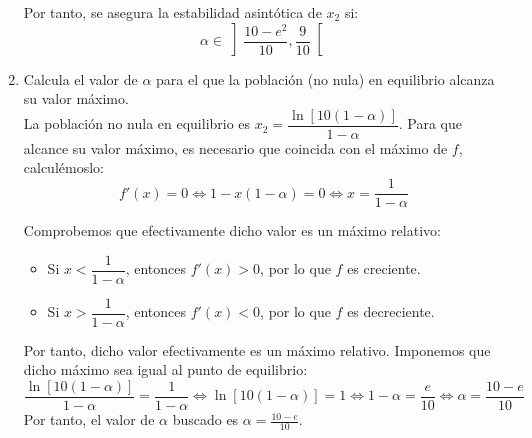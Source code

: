 \begin{ejercicio}
\begin{enumerate}
        Por tanto, se asegura la estabilidad asintótica de $x_2$ si:
        \begin{equation*}
            \alpha\in \left]\frac{10-e^2}{10}, \frac{9}{10}\right[
        \end{equation*}
        
        \item Calcula el valor de $\alpha$ para el que la población (no nula) en equilibrio alcanza su valor máximo.\\

        La población no nula en equilibrio es $x_2 = \dfrac{\ln[10(1-\alpha)]}{1-\alpha}$. Para que alcance su valor máximo, es necesario que coincida con el máximo de $f$, calculémoslo:
        \begin{equation*}
            f'(x) = 0 \Longleftrightarrow 1-x(1-\alpha) = 0 \Longleftrightarrow x = \dfrac{1}{1-\alpha}
        \end{equation*}

        Comprobemos que efectivamente dicho valor es un máximo relativo:
        \begin{itemize}
            \item Si $x<\dfrac{1}{1-\alpha}$, entonces $f'(x)>0$, por lo que $f$ es creciente.
            \item Si $x>\dfrac{1}{1-\alpha}$, entonces $f'(x)<0$, por lo que $f$ es decreciente.
        \end{itemize}

        Por tanto, dicho valor efectivamente es un máximo relativo. Imponemos que dicho máximo sea igual al punto de equilibrio:
        \begin{equation*}
            \dfrac{\ln[10(1-\alpha)]}{1-\alpha} = \dfrac{1}{1-\alpha}
            \Longleftrightarrow
            \ln[10(1-\alpha)] = 1 \Longleftrightarrow
            1-\alpha = \frac{e}{10}
            \Longleftrightarrow
            \alpha=\frac{10-e}{10}
        \end{equation*}
        Por tanto, el valor de $\alpha$ buscado es $\alpha=\frac{10-e}{10}$.
    \end{enumerate}
\end{ejercicio}


